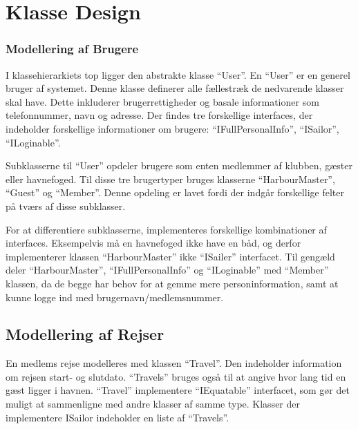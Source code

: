 \section{Klasse Design}
\label{sec:klasse_design}


\label{sub:uml_diagram}

\subsubsection{Modellering af Brugere}
\label{sub:brugere_af_programmet}

I klassehierarkiets top ligger den abstrakte klasse \enquote{User}. En \enquote{User} er en generel bruger af systemet. Denne klasse definerer alle fællestræk de nedvarende klasser skal have. Dette inkluderer brugerrettigheder og basale informationer som telefonnummer, navn og adresse. Der findes tre forskellige interfaces, der indeholder forskellige informationer om brugere: \enquote{IFullPersonalInfo}, \enquote{ISailor}, \enquote{ILoginable}.

Subklasserne til \enquote{User} opdeler brugere som enten medlemmer af klubben, gæster eller havnefoged. Til disse tre brugertyper bruges klasserne \enquote{HarbourMaster}, \enquote{Guest} og \enquote{Member}. Denne opdeling er lavet fordi der indgår forskellige felter på tværs af disse subklasser. 

For at differentiere subklasserne, implementeres forskellige kombinationer af interfaces. Eksempelvis må en havnefoged ikke have en båd, og derfor implementerer klassen \enquote{HarbourMaster} ikke \enquote{ISailer} interfacet. Til gengæld deler \enquote{HarbourMaster}, \enquote{IFullPersonalInfo} og \enquote{ILoginable} med \enquote{Member} klassen, da de begge har behov for at gemme mere personinformation, samt at kunne logge ind med brugernavn/medlemsnummer.

\subsection{Modellering af Rejser}
\label{sub:rejser}

En medlems rejse modelleres med klassen \enquote{Travel}. Den indeholder information om rejsen start- og slutdato. \enquote{Travels} bruges også til at angive hvor lang tid en gæst ligger i havnen. \enquote{Travel} implementere \enquote{IEquatable} interfacet, som gør det muligt at sammenligne med andre klasser af samme type. Klasser der implementere ISailor indeholder en liste af \enquote{Travels}.

